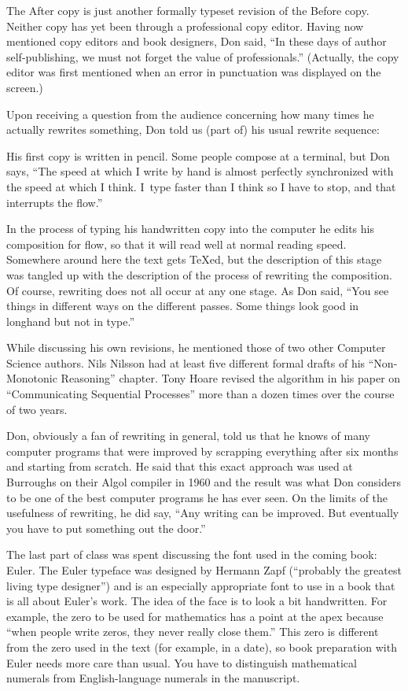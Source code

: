 The After copy is just another formally typeset revision of the Before
copy. Neither copy has yet been through a professional copy editor. Having
now mentioned copy editors and book designers, Don said, ``In these days of
author self-publishing, we must not forget the value of professionals.''
(Actually, the copy editor was first mentioned when an error in punctuation
was displayed on the screen.) 

Upon receiving a question from the audience concerning how many times he
actually rewrites something, Don told us (part of) his usual rewrite
sequence:

His first copy is written in pencil.  Some people compose at a terminal,
but Don says, ``The speed at which I write 
by hand is almost perfectly synchronized
with the speed at which I think.  I~type faster than I think so I have to
stop, and that interrupts the flow.''

In the process of typing his handwritten copy into the computer he edits
his composition for flow, so that it will read well at normal reading speed.
 Somewhere around here the text gets \TeX ed, but
the description of this stage was tangled up with the description of the
process of rewriting the composition. Of course, rewriting does not all
occur at any one stage.  As Don said, ``You see things in different ways on
the different passes. Some things look good in longhand but not in type.''

While discussing his own revisions, he mentioned those of two other
Computer Science authors. Nils Nilsson had 
at least
five different formal drafts of
his ``Non-Monotonic Reasoning'' chapter.  Tony
Hoare revised the algorithm in his paper on ``Communicating Sequential
Processes'' more than a dozen times over the course of two years.  

Don, obviously a fan of rewriting in general, told us that he knows of
many computer programs that were improved by scrapping everything after
six months and starting from scratch.  He said that this exact approach
was used at Burroughs on their Algol compiler in 1960 and the result was what Don
considers to be one of the best computer programs he has ever seen.  On
the limits of the usefulness of rewriting, he did say, ``Any writing can
be improved.  But eventually you have to put something out the door.''

The last part of class was spent discussing the font used in the coming
book: Euler.  The Euler typeface
 was designed by Hermann Zapf (``probably the greatest
living type designer'') and is an especially appropriate font to use in a
book that is all about Euler's work.  The idea of the face is
to look a bit handwritten.  For example, the zero to be used for
mathematics has a point at the apex because ``when people write zeros, they
never really close them.'' This zero is different from the zero used
in the text (for example, in a date), so book preparation with Euler
needs more care than usual. You have to distinguish mathematical numerals
from English-language numerals in the manuscript.

